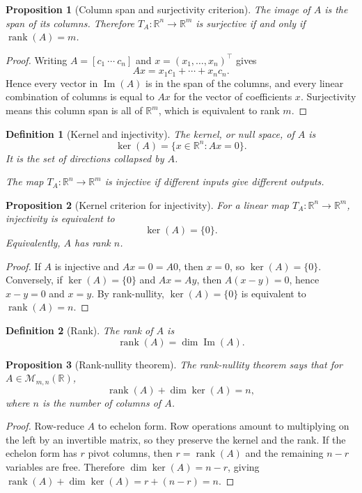 \documentclass[10pt]{article}
\theoremstyle{compactdefinition}
\newtheorem{definition}{Definition}[section]
\theoremstyle{compactproposition}
\newtheorem{proposition}{Proposition}[section]
\newcommand{\R}{\mathbb{R}}
\newcommand{\M}{\mathcal{M}}
\newcommand{\rank}{\operatorname{rank}}
\newcommand{\im}{\operatorname{Im}}
\begin{document}
\begin{proposition}[Column span and surjectivity criterion]
The image of $A$ is the span of its columns. Therefore $T_A:\R^n\to\R^m$ is
surjective if and only if $\rank(A)=m$.
\end{proposition}

\begin{proof}
Writing $A=[c_1\ \cdots\ c_n]$ and $x=(x_1,\ldots,x_n)^\top$ gives
\[
Ax=x_1c_1+\cdots+x_nc_n.
\]
Hence every vector in $\im(A)$ is in the span of the columns, and every linear
combination of columns is equal to $Ax$ for the vector of coefficients $x$.
Surjectivity means this column span is all of $\R^m$, which is equivalent to
rank $m$.
\end{proof}

\begin{definition}[Kernel and injectivity]
The kernel, or null space, of $A$ is
\[
\ker(A)=\{x\in\R^n:Ax=0\}.
\]
It is the set of directions collapsed by $A$.

The map $T_A:\R^n\to\R^m$ is injective if different inputs give different
outputs.
\end{definition}

\begin{proposition}[Kernel criterion for injectivity]
For a linear map $T_A:\R^n\to\R^m$, injectivity is equivalent to
\[
\ker(A)=\{0\}.
\]
Equivalently, $A$ has rank $n$.
\end{proposition}

\begin{proof}
If $A$ is injective and $Ax=0=A0$, then $x=0$, so $\ker(A)=\{0\}$. Conversely,
if $\ker(A)=\{0\}$ and $Ax=Ay$, then $A(x-y)=0$, hence $x-y=0$ and $x=y$.
By rank-nullity, $\ker(A)=\{0\}$ is equivalent to $\rank(A)=n$.
\end{proof}

\begin{definition}[Rank]
The rank of $A$ is
\[
\rank(A)=\dim \im(A).
\]
\end{definition}

\begin{proposition}[Rank-nullity theorem]
The rank-nullity theorem says that for $A\in\M_{m,n}(\R)$,
\[
\rank(A)+\dim\ker(A)=n,
\]
where $n$ is the number of columns of $A$.
\end{proposition}

\begin{proof}
Row-reduce $A$ to echelon form. Row operations amount to multiplying on the
left by an invertible matrix, so they preserve the kernel and the rank. If the
echelon form has $r$ pivot columns, then $r=\rank(A)$ and the remaining $n-r$
variables are free. Therefore $\dim\ker(A)=n-r$, giving
$\rank(A)+\dim\ker(A)=r+(n-r)=n$.
\end{proof}
\end{document}
